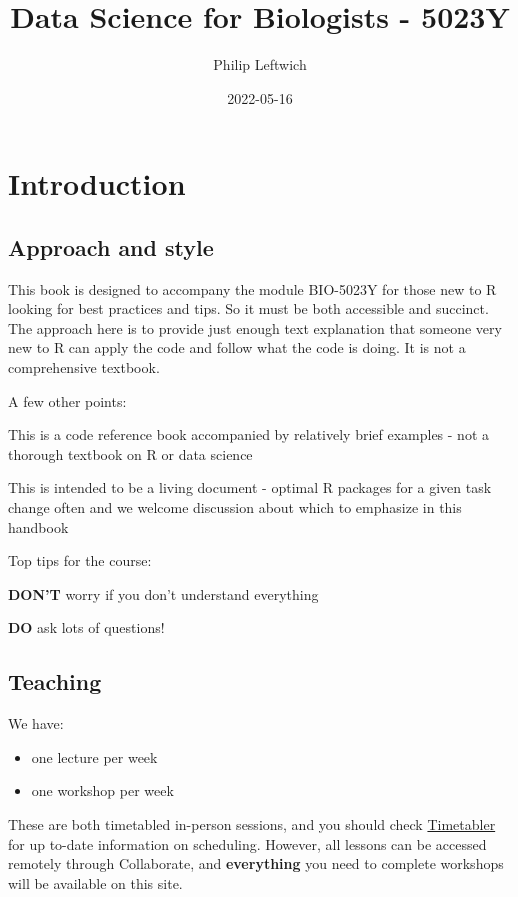 \documentclass[
]{book}
\title{Data Science for Biologists - 5023Y}
\author{Philip Leftwich}
\date{2022-05-16}
\providecommand{\tightlist}{%
  \setlength{\itemsep}{0pt}\setlength{\parskip}{0pt}}
\begin{document}
\maketitle

{
\setcounter{tocdepth}{1}
\tableofcontents
}
\hypertarget{introduction}{%
\chapter{Introduction}\label{introduction}}

\hypertarget{approach-and-style}{%
\section{Approach and style}\label{approach-and-style}}

This book is designed to accompany the module BIO-5023Y for those new to R looking for best practices and tips. So it must be both accessible and succinct. The approach here is to provide just enough text explanation that someone very new to R can apply the code and follow what the code is doing. It is not a comprehensive textbook.

A few other points:

This is a code reference book accompanied by relatively brief examples - not a thorough textbook on R or data science

This is intended to be a living document - optimal R packages for a given task change often and we welcome discussion about which to emphasize in this handbook

Top tips for the course:

\textbf{DON'T} worry if you don't understand everything

\textbf{DO} ask lots of questions!

\hypertarget{teaching}{%
\section{Teaching}\label{teaching}}

We have:

\begin{itemize}
\tightlist
\item
  one lecture per week
\item
  one workshop per week
\end{itemize}

These are both timetabled in-person sessions, and you should check \href{https://timetabler.uea.ac.uk/Timetable}{Timetabler} for up to-date information on scheduling. However, all lessons can be accessed remotely through Collaborate, and \textbf{everything} you need to complete workshops will be available on this site.
\end{document}
